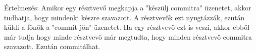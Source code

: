 \begin{enumerate}
		Értelmezés: Amikor egy résztvevő megkapja a "készülj commitra" üzenetet, akkor tudhatja, hogy mindenki készre szavazott. A résztvevők ezt nyugtázzák, ezután küldi a főnök a "commit jön" üzenetet. Ha egy résztvevő ezt is veszi, akkor ebből már tudja hogy minde résztvevő már megtudta, hogy minden résztvevő commitra szavazott. Ezután commitálhat.


	\end{enumerate}
